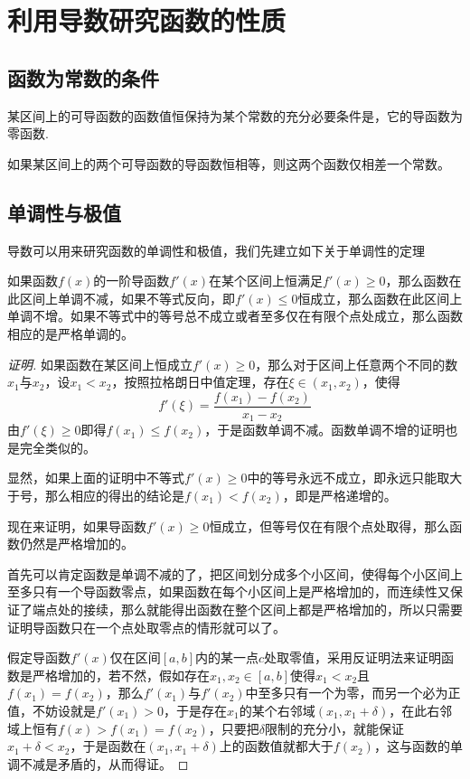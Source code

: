 
\section{利用导数研究函数的性质}
\label{sec:research-function-use-derivative}

\subsection{函数为常数的条件}
\label{sec:condition-for-constant-function}

\begin{theorem}
  某区间上的可导函数的函数值恒保持为某个常数的充分必要条件是，它的导函数为零函数.
\end{theorem}

\begin{inference}
  如果某区间上的两个可导函数的导函数恒相等，则这两个函数仅相差一个常数。
\end{inference}

\subsection{单调性与极值}
\label{sec:research-monotonicity-and-minmax-value}

导数可以用来研究函数的单调性和极值，我们先建立如下关于单调性的定理
\begin{theorem}
  如果函数$f(x)$的一阶导函数$f'(x)$在某个区间上恒满足$f'(x) \geqslant 0$，那么函数在此区间上单调不减，如果不等式反向，即$f'(x) \leqslant 0$恒成立，那么函数在此区间上单调不增。如果不等式中的等号总不成立或者至多仅在有限个点处成立，那么函数相应的是严格单调的。
\end{theorem}

\begin{proof}[证明]
  如果函数在某区间上恒成立$f'(x) \geqslant 0$，那么对于区间上任意两个不同的数$x_1$与$x_2$，设$x_1<x_2$，按照拉格朗日中值定理，存在$\xi \in (x_1,x_2)$，使得
  \[ f'(\xi) = \frac{f(x_1)-f(x_2)}{x_1-x_2} \]
  由$f'(\xi) \geqslant 0$即得$f(x_1) \leqslant f(x_2)$，于是函数单调不减。函数单调不增的证明也是完全类似的。

  显然，如果上面的证明中不等式$f'(x) \geqslant 0$中的等号永远不成立，即永远只能取大于号，那么相应的得出的结论是$f(x_1)<f(x_2)$，即是严格递增的。

  现在来证明，如果导函数$f'(x) \geqslant 0$恒成立，但等号仅在有限个点处取得，那么函数仍然是严格增加的。

  首先可以肯定函数是单调不减的了，把区间划分成多个小区间，使得每个小区间上至多只有一个导函数零点，如果函数在每个小区间上是严格增加的，而连续性又保证了端点处的接续，那么就能得出函数在整个区间上都是严格增加的，所以只需要证明导函数只在一个点处取零点的情形就可以了。

  假定导函数$f'(x)$仅在区间$[a,b]$内的某一点$c$处取零值，采用反证明法来证明函数是严格增加的，若不然，假如存在$x_1,x_2 \in [a,b]$使得$x_1<x_2$且$f(x_1)=f(x_2)$，那么$f'(x_1)$与$f'(x_2)$中至多只有一个为零，而另一个必为正值，不妨设就是$f'(x_1)>0$，于是存在$x_1$的某个右邻域$(x_1,x_1+\delta)$，在此右邻域上恒有$f(x)>f(x_1)=f(x_2)$，只要把$\delta$限制的充分小，就能保证$x_1+\delta<x_2$，于是函数在$(x_1,x_1+\delta)$上的函数值就都大于$f(x_2)$，这与函数的单调不减是矛盾的，从而得证。
\end{proof}

